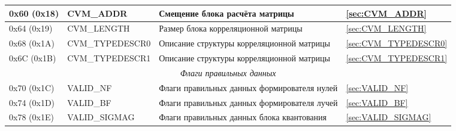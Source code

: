 \begin{longtable}{|p{30mm}|p{55mm}|p{6cm}|p{15mm}|}
0x60 (0x18)  & CVM\_ADDR          	& Смещение блока расчёта матрицы                & \ref{sec:CVM_ADDR} \\
\hline
0x64 (0x19)  & CVM\_LENGTH          	& Размер блока корреляционной матрицы           & \ref{sec:CVM_LENGTH} \\
\hline
0x68 (0x1A)  & CVM\_TYPEDESCR0         	& Описание структуры корреляционной матрицы     & \ref{sec:CVM_TYPEDESCR0} \\
\hline
0x6C (0x1B)  & CVM\_TYPEDESCR1         	& Описание структуры корреляционной матрицы     & \ref{sec:CVM_TYPEDESCR1} \\
\hline

\multicolumn{4}{|c|}{\textit{Флаги правильных данных}} \\
\hline

0x70 (0x1C)  & VALID\_NF          	& Флаги правильных данных формирователя нулей   & \ref{sec:VALID_NF} \\
\hline
0x74 (0x1D)  & VALID\_BF          	& Флаги правильных данных формирователя лучей   & \ref{sec:VALID_BF} \\
\hline
0x78 (0x1E)  & VALID\_SIGMAG          	& Флаги правильных данных блока квантования     & \ref{sec:VALID_SIGMAG} \\
\hline


\end{longtable}
